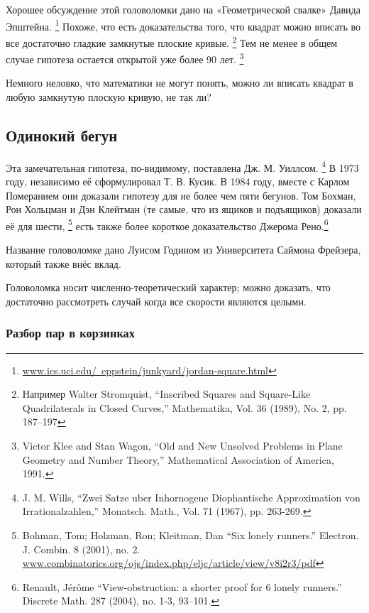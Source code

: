 Хорошее обсуждение этой головоломки дано на «Геометрической свалке» Давида Эпштейна.%
\footnote{\href{http://www.ics.uci.edu/~eppstein/junkyard/jordan-square.html}{www.ics.uci.edu/~eppstein/junkyard/jordan-square.html}}
Похоже, что есть доказательства того, что квадрат можно вписать во все достаточно гладкие замкнутые плоские кривые.%
\footnote{Например Walter Stromquist, ``Inscribed Squares and Square-Like Quadrilaterals in Closed Curves,'' Mathematika, Vol. 36 (1989), No. 2, pp. 187--197}
Тем не менее в общем случае гипотеза остается открытой уже более 90 лет.
\footnote{Victor Klee and Stan Wagon, ``Old and New Unsolved Problems in Plane Geometry and Number Theory,'' Mathematical Association of America, 1991.}

\medskip

Немного неловко, что математики не могут понять, можно ли вписать квадрат в любую замкнутую плоскую кривую, не так ли?

\subsection*{Одинокий бегун}

Эта замечательная гипотеза, по-видимому, поставлена Дж. М. Уиллсом.%
\footnote{J. M. Wills, ``Zwei Satze uber Inhornogene Diophantische Approximation von Irrationalzahlen,'' Monatsch. Math., Vol. 71 (1967), pp. 263-269.}
В 1973 году, независимо её сформулировал Т. В. Кусик.
В 1984 году, вместе с Карлом Померанием они доказали гипотезу для не более чем пяти бегунов.
Том Бохман, Рон Хольцман и Дэн Клейтман (те самые, что из ящиков и подъящиков) доказали её для шести,
\footnote{Bohman, Tom; Holzman, Ron; Kleitman, Dan
``Six lonely runners.''
Electron. J. Combin. 8 (2001), no. 2.\\
\href{https://www.combinatorics.org/ojs/index.php/eljc/article/view/v8i2r3/pdf}{www.combinatorics.org/ojs/index.php/eljc/article/view/v8i2r3/pdf}}
есть также более короткое доказательство Джерома Рено.\footnote{Renault, J\'{e}r\^{o}me ``View-obstruction: a shorter proof for 6 lonely runners.'' Discrete Math. 287 (2004), no. 1-3, 93--101.}

\medskip

Название головоломке дано Луисом Годином из Университета Саймона Фрейзера, который также внёс вклад. %

Головоломка носит численно-теоретический характер; можно доказать, что достаточно рассмотреть случай когда все скорости являются целыми.

\subsubsection*{Разбор пар в корзинках}

